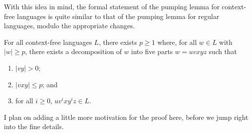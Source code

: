 With this idea in mind, the formal statement of the pumping lemma for context-free languages is quite similar to that of the pumping lemma for regular languages, modulo the appropriate changes.

\begin{lemma}\label{lem:pumpingcontextfree}
For all context-free languages $L$, there exists $p \geq 1$ where, for all $w \in L$ with $|w| \geq p$, there exists a decomposition of $w$ into five parts $w = uvxyz$ such that
\begin{enumerate}
\item $|vy| > 0$;
\item $|vxy| \leq p$; and
\item for all $i \geq 0$, $uv^{i}xy^{i}z \in L$.
\end{enumerate}
\end{lemma}

\begin{construction}
I plan on adding a little more motivation for the proof here, before we jump right into the fine details.
\end{construction}

